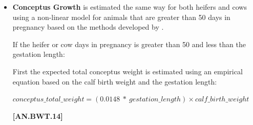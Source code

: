 \begin{refsection}
\begin{itemize}
\begin{center}
    \(target\_average\_daily\_gain = \frac{(1 - 0.92) × MSBW}{calving\_interval}\)
\end{center}
    \vspace{0.5cm}
    
    {\raggedleft \textbf{[AN.BWT.12]}\par}
    \vspace{0.5cm}
    
    \textbf{\textit{If pregnant:}}
    \vspace{0.5cm}
    
\begin{center}
    \(target\_average\_daily\_gain = \frac{(MSBW - bodyweight)}{gestation\_length - DIP}\)
\end{center}
    \vspace{0.5cm}
    
    {\raggedleft \textbf{[AN.BWT.13]}\par}
    \vspace{0.5cm}
    
The gestation length for cows is estimated with the same methods that are used for heifers and the calving interval is set either as the average herd calving interval or the animal’s own calving interval which is calculated as the age at her second calving minus her age at first calving as part of the daily\_reproduction\_update in animal.py.

    \item \textbf{Conceptus Growth} is estimated the same way for both heifers and cows using a non-linear model for animals that are greater than 50 days in pregnancy based on the methods developed by \textcite{Korver1985}. 
    \vspace{0.25cm}
    
    If the heifer or cow days in pregnancy is greater than 50  and less than the gestation length:

    First the expected total conceptus weight is estimated using an empirical equation based on the calf birth weight and the gestation length:
     \vspace{0.5cm}
     
\begin{center}
    \(conceptus\_total\_weight = (0.0148\ *\ gestation\_length) × calf\_birth\_weight\)
\end{center}
    \vspace{0.5cm}
    
    {\raggedleft \textbf{[AN.BWT.14]}\par}
    \vspace{0.5cm}
    

\end{itemize}
\end{refsection}
